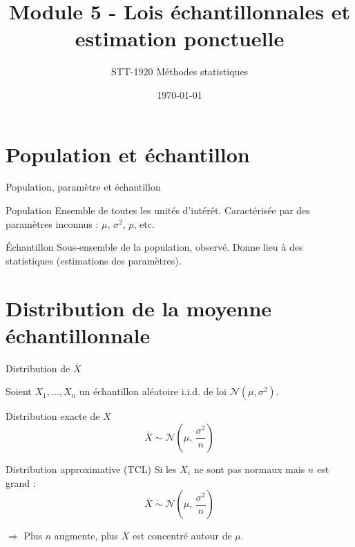 \documentclass{BeamerTemplate}
\title{Module 5 - Lois échantillonnales et estimation ponctuelle}
\subtitle{STT-1920 Méthodes statistiques}
\date{\today}
\begin{document}
\begin{frame}[t]
  \titlepage
\end{frame}

\section{Population et échantillon}

\begin{frame}[t]{Population, paramètre et échantillon}

\begin{Boite}{Population}
Ensemble de toutes les unités d'intérêt. Caractérisée par des \alert{paramètres} inconnus : $\mu$, $\sigma^2$, $p$, etc.
\end{Boite}

\begin{Boite}{Échantillon}
Sous-ensemble de la population, observé. Donne lieu à des \alert{statistiques} (estimations des paramètres).
\end{Boite}

\medskip
\begin{center}
\end{center}

\end{frame}

\section{Distribution de la moyenne échantillonnale}

\begin{frame}[t]{Distribution de $\overline{X}$}

Soient $X_1, \ldots, X_n$ un échantillon aléatoire i.i.d. de loi $\mathcal{N}(\mu, \sigma^2)$.

\bigskip
\begin{Boite}{Distribution exacte de $\overline{X}$}
$$\overline{X} \sim \mathcal{N}\!\left(\mu,\, \frac{\sigma^2}{n}\right)$$
\end{Boite}

\medskip
\begin{Boite}{Distribution approximative (TCL)}
Si les $X_i$ ne sont pas normaux mais $n$ est grand :
$$\overline{X} \;\dot{\sim}\; \mathcal{N}\!\left(\mu,\, \frac{\sigma^2}{n}\right)$$
\end{Boite}

\medskip
$\Rightarrow$ Plus $n$ augmente, plus $\overline{X}$ est concentré autour de $\mu$.

\end{frame}
\end{document}
